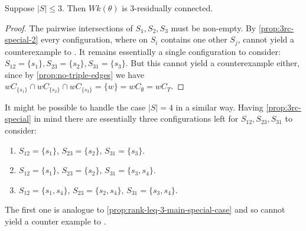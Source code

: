 \begin{coro}
	Suppose $|S| \leq 3$. Then $Wk(\theta)$ is 3-residually connected.

	\begin{proof}
		The pairwise intersections of $S_1,S_2,S_3$ must be non-empty. By \ref{prop:3rc-special-2} every configuration, where on $S_i$ contains one other $S_j$, cannot yield a counterexample to . It remains essentially a single configuration to consider: $S_{12} = \{s_1\}, S_{23} = \{s_2\}, S_{31} = \{s_3\}$. But this cannot yield a counterexample either, since by \ref{prop:no-triple-edges} we have $w C_{\{s_1\}} \cap w C_{\{s_2\}} \cap w C_{\{s_3\}} = \{ w \} = w C_\emptyset = w C_T$.
	\end{proof}
\end{coro}

\begin{rema}
	It might be possible to handle the case $|S| = 4$ in a similar way. Having \ref{prop:3rc-special} in mind there are essentially three configurations left for $S_{12},S_{23},S_{31}$ to consider:
	\begin{enumerate}
		\item $S_{12} = \{s_1\}$, $S_{23} = \{s_2\}$, $S_{31} = \{s_3\}$.
		\item $S_{12} = \{s_1\}$, $S_{23} = \{s_2\}$, $S_{31} = \{s_3,s_4\}$.
		\item $S_{12} = \{s_1,s_4\}$, $S_{23} = \{s_2,s_4\}$, $S_{31} = \{s_3,s_4\}$.
	\end{enumerate}
	The first one is analogue to \ref{prop:rank-leq-3-main-special-case} and so cannot yield a counter example to .
\end{rema}

